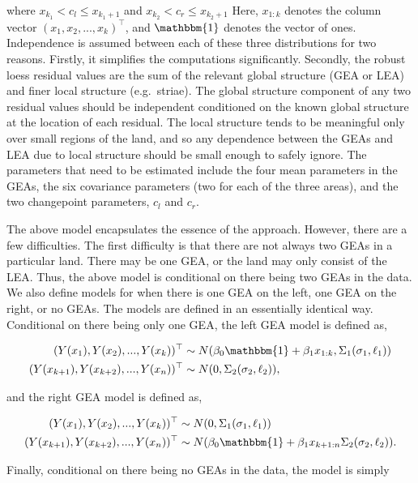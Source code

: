 \documentclass[12pt]{article}
\begin{document}
\noindent where \(x_{k_1} < c_l \leq x_{k_1 + 1}\) and
\(x_{k_2} < c_r \leq x_{k_2 + 1}\) Here, \(x_{1:k}\) denotes the column
vector \((x_1, x_2, ..., x_k)^\top\), and \(\mathbbm{1}\) denotes the
vector of ones. Independence is assumed between each of these three
distributions for two reasons. Firstly, it simplifies the computations
significantly. Secondly, the robust loess residual values are the sum of
the relevant global structure (GEA or LEA) and finer local structure
(e.g.~striae). The global structure component of any two residual values
should be independent conditioned on the known global structure at the
location of each residual. The local structure tends to be meaningful
only over small regions of the land, and so any dependence between the
GEAs and LEA due to local structure should be small enough to safely
ignore. The parameters that need to be estimated include the four mean
parameters in the GEAs, the six covariance parameters (two for each of
the three areas), and the two changepoint parameters, \(c_l\) and
\(c_r\).

The above model encapsulates the essence of the approach. However, there
are a few difficulties. The first difficulty is that there are not
always two GEAs in a particular land. There may be one GEA, or the land
may only consist of the LEA. Thus, the above model is conditional on
there being two GEAs in the data. We also define models for when there
is one GEA on the left, one GEA on the right, or no GEAs. The models are
defined in an essentially identical way. Conditional on there being only
one GEA, the left GEA model is defined as,

\begin{align}
(Y(x_1), Y(x_2), ..., Y(x_{k}))^{\top} &\sim N(\beta_{0}\mathbbm{1} + \beta_{1} x_{1:k}, \Sigma_1(\sigma_1, \ell_1)) \\
(Y(x_{k + 1}), Y(x_{k + 2}), ..., Y(x_{n}))^{\top} &\sim N(0, \Sigma_2(\sigma_2, \ell_2)),
\end{align}

\noindent and the right GEA model is defined as,

\begin{align}
(Y(x_{1}), Y(x_{2}), ..., Y(x_{k}))^{\top} &\sim N(0, \Sigma_1(\sigma_1, \ell_1)) \\ 
(Y(x_{k + 1}), Y(x_{k + 2}), ..., Y(x_n))^{\top} &\sim N(\beta_{0}\mathbbm{1} + \beta_{1} x_{k + 1:n} \Sigma_2(\sigma_2, \ell_2)).
\end{align}

\noindent Finally, conditional on there being no GEAs in the data, the
model is simply
\end{document}
